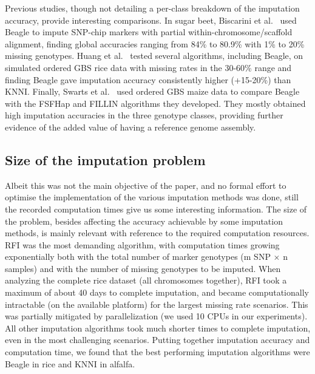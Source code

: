 Previous studies, though not detailing a per-class breakdown of the imputation accuracy, provide interesting comparisons. In sugar beet, Biscarini et al.~\cite{biscarini_genome-enabled_2014} used Beagle to impute SNP-chip markers with partial within-chromosome/scaffold alignment, finding global accuracies ranging from 84\% to 80.9\% with 1\% to 20\% missing genotypes. Huang et al.~\cite{huang_efficient_2014} tested several algorithms, including Beagle, on simulated ordered GBS rice data with missing rates in the 30-60\% range and finding Beagle gave imputation accuracy consistently higher (+15-20\%) than KNNI. 
Finally, Swarts et al.~\cite{swarts_novel_2014} used ordered GBS maize data to compare Beagle with the FSFHap and FILLIN algorithms they developed. They mostly obtained high imputation accuracies in the three genotype classes, providing further evidence of the added value of having a reference genome assembly.

\subsection{Size of the imputation problem}
\label{sec:size_of_problem}
Albeit this was not the main objective of the paper, and no formal effort to optimise the implementation of the various imputation methods was done, still the recorded computation times give us some interesting information.
The size of the problem, besides affecting the accuracy achievable by some imputation methods, is mainly relevant with reference to the required computation resources. RFI was the most demanding algorithm, with computation times growing exponentially both with the total number of marker genotypes (m SNP $\times$ n samples) and with the number of missing genotypes to be imputed. When analyzing the complete rice dataset (all chromosomes together), RFI took a maximum of about 40 days to complete imputation, and became computationally intractable (on the available platform) for the largest missing rate scenarios. This was partially mitigated by parallelization (we used 10 CPUs in our experiments). All other imputation algorithms took much shorter times to complete imputation, even in the most challenging scenarios. Putting together imputation accuracy and computation time, we found that the best performing imputation algorithms were Beagle in rice and KNNI in alfalfa.
 
